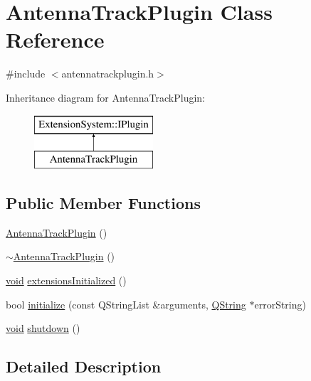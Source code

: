 \hypertarget{class_antenna_track_plugin}{\section{\-Antenna\-Track\-Plugin \-Class \-Reference}
\label{class_antenna_track_plugin}
}


{\ttfamily \#include $<$antennatrackplugin.\-h$>$}

\-Inheritance diagram for \-Antenna\-Track\-Plugin\-:\begin{figure}[H]
\begin{center}
\leavevmode
\includegraphics[height=2.000000cm]{class_antenna_track_plugin}
\end{center}
\end{figure}
\subsection*{\-Public \-Member \-Functions}
\begin{DoxyCompactItemize}
\item 
\hyperlink{class_antenna_track_plugin_ab54dcdb214e3f2d6a4399308605864b1}{\-Antenna\-Track\-Plugin} ()
\item 
\hyperlink{class_antenna_track_plugin_addd54210e941b2d9fa6106c351f72f97}{$\sim$\-Antenna\-Track\-Plugin} ()
\item 
\hyperlink{group___u_a_v_objects_plugin_ga444cf2ff3f0ecbe028adce838d373f5c}{void} \hyperlink{class_antenna_track_plugin_a370afea2fcc519ae07e072bf227f096c}{extensions\-Initialized} ()
\item 
bool \hyperlink{class_antenna_track_plugin_a8bcbdaaf5cd20fa3a61f6c7bd9b5d514}{initialize} (const \-Q\-String\-List \&arguments, \hyperlink{group___u_a_v_objects_plugin_gab9d252f49c333c94a72f97ce3105a32d}{\-Q\-String} $\ast$error\-String)
\item 
\hyperlink{group___u_a_v_objects_plugin_ga444cf2ff3f0ecbe028adce838d373f5c}{void} \hyperlink{class_antenna_track_plugin_a3628ddddb3154268c34dfd1f69c6e8f4}{shutdown} ()
\end{DoxyCompactItemize}


\subsection{\-Detailed \-Description}


